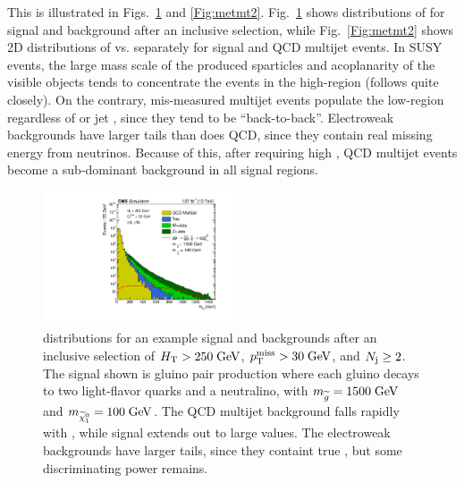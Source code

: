 This is illustrated in Figs.~\ref{Fig:inclusive_mt2} and \ref{Fig:metmt2}.
Fig.~\ref{Fig:inclusive_mt2} shows distributions of \mttwo for signal and background after an inclusive selection,
while Fig.~\ref{Fig:metmt2} shows 2D distributions of \mttwo vs. \ptmiss separately for signal and QCD multijet events.
In SUSY events, the large mass scale of the produced sparticles and acoplanarity of the visible objects tends to concentrate
the events in the high-\mttwo region (\mttwo follows \ptmiss quite closely). On the contrary, mis-measured multijet events
populate the low-\mttwo region regardless of \ptmiss or jet \pt, since they tend to be ``back-to-back''.
Electroweak backgrounds have larger \mttwo tails than does QCD, since they contain real missing energy from neutrinos.
Because of this, after requiring high \mttwo, QCD multijet events become a sub-dominant background in all signal regions.


\begin{figure}[ht]
  \begin{center}
    \includegraphics[width=0.50\textwidth]{figs/overview_mt2/inclusive_mt2.pdf}
    \caption{\mttwo distributions for an example signal and backgrounds after an inclusive selection of $H_{\mathrm{T}}>250\;\text{Ge\hspace{-.08em}V}$, $p_{\mathrm{T}}^{\mathrm{miss}}>30\;\text{Ge\hspace{-.08em}V}$, and $N_{\mathrm{j}}\geq2$.
      The signal shown is gluino pair production where each gluino decays to two light-flavor quarks and a neutralino, with 
      $m_{\widetilde{g}}=1500\;\text{Ge\hspace{-.08em}V}$ and $m_{\widetilde{\chi}_1^0}=100\;\text{Ge\hspace{-.08em}V}$.
      The QCD multijet background falls rapidly with \mttwo, while signal extends out to large values. The electroweak backgrounds
      have larger tails, since they containt true \ptmiss, but some discriminating power remains.
            }
    \label{Fig:inclusive_mt2}
  \end{center}
\end{figure}


